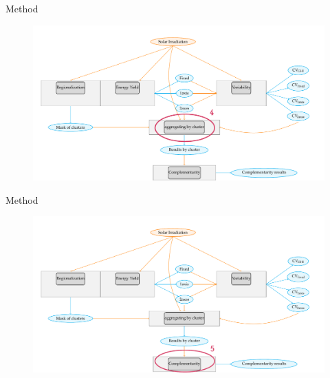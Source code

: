 \documentclass{beamer}%
\begin{document}
\begin{frame}[fragile]{Method}
\begin{figure}  
\includegraphics[scale=0.45]{multi_step5.pdf}
\end{figure}
\end{frame}

\begin{frame}[fragile]{Method}
\begin{figure}  
\includegraphics[scale=0.45]{multi_step6.pdf}
\end{figure}
\end{frame}
\end{document}

